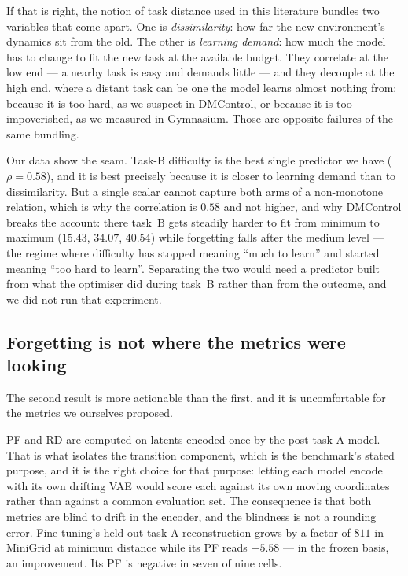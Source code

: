 If that is right, the notion of task distance used in this literature bundles
two variables that come apart. One is \emph{dissimilarity}: how far the new
environment's dynamics sit from the old. The other is \emph{learning demand}: how
much the model has to change to fit the new task at the available budget. They
correlate at the low end --- a nearby task is easy and demands little --- and they
decouple at the high end, where a distant task can be one the model learns
almost nothing from: because it is too hard, as we suspect in DMControl, or
because it is too impoverished, as we measured in Gymnasium. Those are opposite
failures of the same bundling.

Our data show the seam. Task-B difficulty is the best single predictor we have
($\rho = 0.58$), and it is best precisely because it is closer to learning
demand than to dissimilarity. But a single scalar cannot capture both arms of a
non-monotone relation, which is why the correlation is $0.58$ and not higher, and
why DMControl breaks the account: there task~B gets steadily harder to fit from
minimum to maximum ($15.43$, $34.07$, $40.54$) while forgetting falls after the
medium level --- the regime where difficulty has stopped meaning ``much to learn''
and started meaning ``too hard to learn''. Separating the two would need a
predictor built from what the optimiser did during task~B rather than from the
outcome, and we did not run that experiment.

\subsection{Forgetting is not where the metrics were looking}
\label{sec:discussion:encoder}

The second result is more actionable than the first, and it is uncomfortable for
the metrics we ourselves proposed.

PF and RD are computed on latents encoded once by the post-task-A model. That is
what isolates the transition component, which is the benchmark's stated purpose,
and it is the right choice for that purpose: letting each model encode with its
own drifting VAE would score each against its own moving coordinates rather than
against a common evaluation set. The consequence is that both metrics are blind
to drift in the encoder, and the blindness is not a rounding error. Fine-tuning's
held-out task-A reconstruction grows by a factor of $811$ in MiniGrid at minimum
distance while its PF reads $-5.58$ --- in the frozen basis, an improvement. Its
PF is negative in seven of nine cells.


